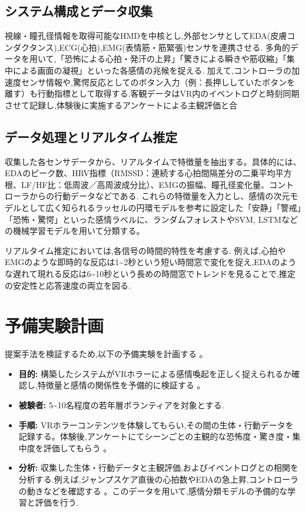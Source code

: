 \documentclass[paper=a4paper,fontsize=10pt,jafontscale=0.925,twocolumn]{jlreq}
\begin{document}
\subsection{システム構成とデータ収集}

視線・瞳孔径情報を取得可能なHMDを中核とし,外部センサとしてEDA(皮膚コンダクタンス),ECG(心拍),EMG(表情筋・筋緊張)センサを連携させる. 多角的データを用いて,「恐怖による心拍・発汗の上昇」「驚きによる瞬きや筋収縮」「集中による画面の凝視」といった各感情の兆候を捉える. 加えて,コントローラの加速度センサ情報や,驚愕反応としてのボタン入力（例：長押ししていたボタンを離す）も行動指標として取得する.客観データはVR内のイベントログと時刻同期させて記録し,体験後に実施するアンケートによる主観評価と合

\subsection{データ処理とリアルタイム推定}

収集した各センサデータから、リアルタイムで特徴量を抽出する。具体的には、EDAのピーク数、HRV指標（RMSSD：連続する心拍間隔差分の二乗平均平方根、LF/HF比：低周波／高周波成分比）、EMGの振幅、瞳孔径変化量、コントローラからの行動データなどである. これらの特徴量を入力とし、感情の次元モデルとして広く知られるラッセルの円環モデル\cite{Russell1980}を参考に設定した「安静」「警戒」「恐怖・驚愕」といった感情ラベルに、ランダムフォレストやSVM, LSTMなどの機械学習モデルを用いて分類する。

リアルタイム推定においては,各信号の時間的特性を考慮する. 例えば,心拍やEMGのような即時的な反応は1\textasciitilde2秒という短い時間窓で変化を捉え,EDAのような遅れて現れる反応は6\textasciitilde10秒という長めの時間窓でトレンドを見ることで,推定の安定性と応答速度の両立を図る.

\section{予備実験計画}

提案手法を検証するため,以下の予備実験を計画する 。

\begin{itemize}
    \item \textbf{目的:} 構築したシステムがVRホラーによる感情喚起を正しく捉えられるか確認し,特徴量と感情の関係性を予備的に検証する 。
    \item \textbf{被験者:} 5\textasciitilde10名程度の若年層ボランティアを対象とする.
    \item \textbf{手順:} VRホラーコンテンツを体験してもらい,その間の生体・行動データを記録する。体験後,アンケートにてシーンごとの主観的な恐怖度・驚き度・集中度を評価してもらう 。
    \item \textbf{分析:} 収集した生体・行動データと主観評価,およびイベントログとの相関を分析する.例えば,ジャンプスケア直後の心拍数やEDAの急上昇,コントローラの動きなどを確認する 。このデータを用いて,感情分類モデルの予備的な学習と評価を行う.
\end{itemize}
\end{document}
